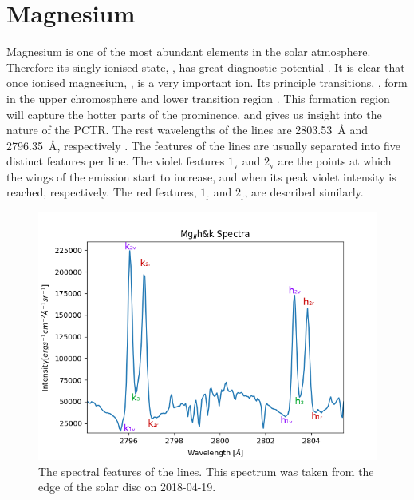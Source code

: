 \section{Magnesium}
Magnesium is one of the most abundant elements in the solar atmosphere. Therefore its singly ionised state, \mgii{}, has great diagnostic potential \citep{leenaarts_formation_2013-1}. It is clear that once ionised magnesium, \mgii{}, is a very important ion. Its principle transitions, \mgiihk{}, form in the upper chromosphere and lower transition region \citep{depontieu_interface_2014}. This formation region will capture the hotter parts of the prominence, and gives us insight into the nature of the PCTR. The rest wavelengths of the \mgiihk{} lines are 2803.53~\AA{} and 2796.35~\AA, respectively \citep{levens_modelling_2019}. The features of the \mgiihk{} lines are usually separated into five distinct features per line. The violet features $1_\text{v}$ and $2_\text{v}$ are the points at which the wings of the emission start to increase, and when its peak violet intensity is reached, respectively. The red features, $1_\text{r}$ and $2_\text{r}$, are described similarly.
\begin{figure}
    \centering
    \includegraphics*[width=0.8\linewidth]{./00Introduction/figs/mgii.png}
    \caption{The spectral features of the \mgiihk{} lines. This spectrum was taken from the edge of the solar disc on 2018-04-19.}
    \label{fig:mgiifeatures}
\end{figure}
